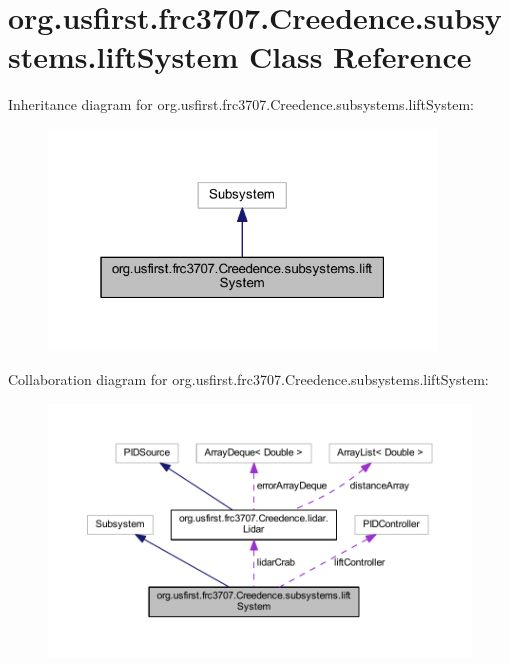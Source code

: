 \hypertarget{classorg_1_1usfirst_1_1frc3707_1_1_creedence_1_1subsystems_1_1lift_system}{}\section{org.\+usfirst.\+frc3707.\+Creedence.\+subsystems.\+lift\+System Class Reference}
\label{classorg_1_1usfirst_1_1frc3707_1_1_creedence_1_1subsystems_1_1lift_system}


Inheritance diagram for org.\+usfirst.\+frc3707.\+Creedence.\+subsystems.\+lift\+System\+:
\nopagebreak
\begin{figure}[H]
\begin{center}
\leavevmode
\includegraphics[width=292pt]{classorg_1_1usfirst_1_1frc3707_1_1_creedence_1_1subsystems_1_1lift_system__inherit__graph}
\end{center}
\end{figure}


Collaboration diagram for org.\+usfirst.\+frc3707.\+Creedence.\+subsystems.\+lift\+System\+:
\nopagebreak
\begin{figure}[H]
\begin{center}
\leavevmode
\includegraphics[width=350pt]{classorg_1_1usfirst_1_1frc3707_1_1_creedence_1_1subsystems_1_1lift_system__coll__graph}
\end{center}
\end{figure}
